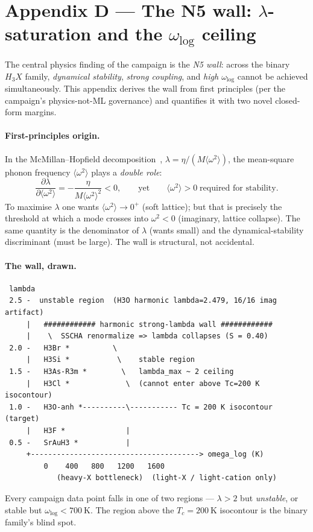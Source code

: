 \section{Appendix D --- The N5 wall: $\lambda$-saturation and the
$\omega_{\log}$ ceiling}
\label{app:D}

The central physics finding of the campaign is the \emph{N5 wall}: across
the binary $H_3X$ family, \emph{dynamical stability}, \emph{strong coupling},
and \emph{high $\omega_{\log}$} cannot be achieved simultaneously. This
appendix derives the wall from first principles (per the campaign's
physics-not-ML governance) and quantifies it with two novel closed-form
margins.

\paragraph{First-principles origin.}
In the McMillan--Hopfield decomposition~\cite{mcmillan1968,hopfield1969},
$\lambda = \eta/(M\langle\omega^2\rangle)$, the mean-square phonon frequency
$\langle\omega^2\rangle$ plays a \emph{double role}:
\begin{equation}
\frac{\partial\lambda}{\partial\langle\omega^2\rangle}
  = -\frac{\eta}{M\langle\omega^2\rangle^2} < 0,
\qquad\text{yet}\qquad
\langle\omega^2\rangle > 0 \;\text{required for stability.}
\end{equation}
To maximise $\lambda$ one wants $\langle\omega^2\rangle \to 0^+$ (soft
lattice); but that is precisely the threshold at which a mode crosses into
$\omega^2 < 0$ (imaginary, lattice collapse). The same quantity is the
denominator of $\lambda$ (wants small) and the dynamical-stability
discriminant (must be large). The wall is structural, not accidental.

\paragraph{The wall, drawn.}
\begin{verbatim}
 lambda
 2.5 -  unstable region  (H3O harmonic lambda=2.479, 16/16 imag artifact)
     |   ############ harmonic strong-lambda wall ############
     |    \  SSCHA renormalize => lambda collapses (S = 0.40)
 2.0 -   H3Br *          \
     |   H3Si *           \    stable region
 1.5 -   H3As-R3m *        \   lambda_max ~ 2 ceiling
     |   H3Cl *             \  (cannot enter above Tc=200 K isocontour)
 1.0 -   H3O-anh *----------\----------- Tc = 200 K isocontour (target)
     |   H3F *              |
 0.5 -   SrAuH3 *           |
     +---------------------------------------> omega_log (K)
         0    400   800   1200   1600
            (heavy-X bottleneck)  (light-X / light-cation only)
\end{verbatim}
Every campaign data point falls in one of two regions --- $\lambda > 2$ but
\emph{unstable}, or stable but $\omega_{\log} < \SI{700}{\kelvin}$. The
region above the $T_c = \SI{200}{\kelvin}$ isocontour is the binary
family's blind spot.

